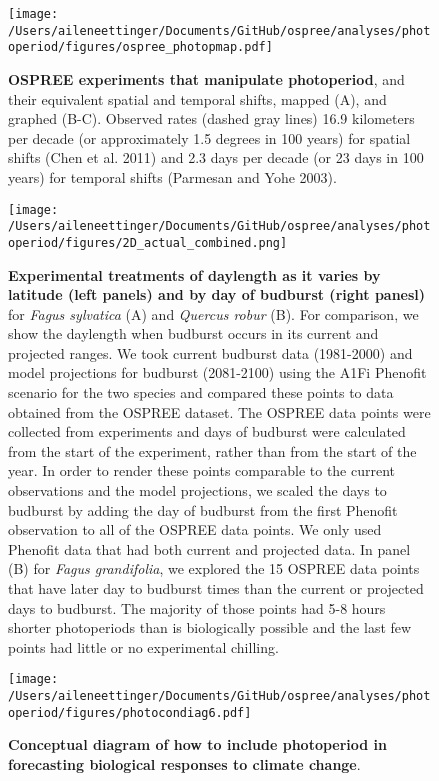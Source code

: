 \documentclass{article}
\begin{document}
\begin{figure}[p]
\centering
\texttt{[image: /Users/aileneettinger/Documents/GitHub/ospree/analyses/photoperiod/figures/ospree\_photopmap.pdf]} 
\caption{\textbf{OSPREE experiments that manipulate photoperiod}, and their equivalent spatial and temporal shifts, mapped (A), and graphed (B-C). Observed rates (dashed gray lines) 16.9 kilometers per decade (or approximately 1.5 degrees in 100 years) for spatial shifts (Chen et al. 2011) and 2.3 days per decade (or 23 days in 100 years) for temporal shifts (Parmesan and Yohe 2003).}
 \label{fig:photomap}
 \end{figure}


 
 
\begin{figure}[p]
\texttt{[image: /Users/aileneettinger/Documents/GitHub/ospree/analyses/photoperiod/figures/2D\_actual\_combined.png]} 
\caption{\textbf{Experimental treatments of daylength as it varies by latitude (left panels) and by day of budburst (right panesl)} for \textit{Fagus sylvatica} (A) and \textit{Quercus robur} (B). For comparison, we show the daylength when budburst occurs in its current and projected ranges. We took current budburst data (1981-2000) and model projections for budburst (2081-2100) using the A1Fi Phenofit scenario \citep{duputie2015} for the two species and compared these points to data obtained from the OSPREE dataset. The OSPREE data points were collected from experiments and days of budburst were calculated from the start of the experiment, rather than from the start of the year. In order to render these points comparable to the current observations and the model projections, we scaled the days to budburst by adding the day of budburst from the first Phenofit observation to all of the OSPREE data points. We only used Phenofit data that had both current and projected data. In panel (B) for \textit{Fagus grandifolia}, we explored the 15 OSPREE data points that have later day to budburst times than the current or projected days to budburst. The majority of those points had 5-8 hours shorter photoperiods than is biologically possible and the last few points had little or no experimental chilling.}
 \label{fig:fagus}
 \end{figure}
 
\begin{figure}[p]
\texttt{[image: /Users/aileneettinger/Documents/GitHub/ospree/analyses/photoperiod/figures/photocondiag6.pdf]} 
\caption{\textbf{Conceptual diagram of how to include photoperiod in forecasting biological responses to climate change}.}
 \label{fig:condiag}
 \end{figure}
 
\end{document}
